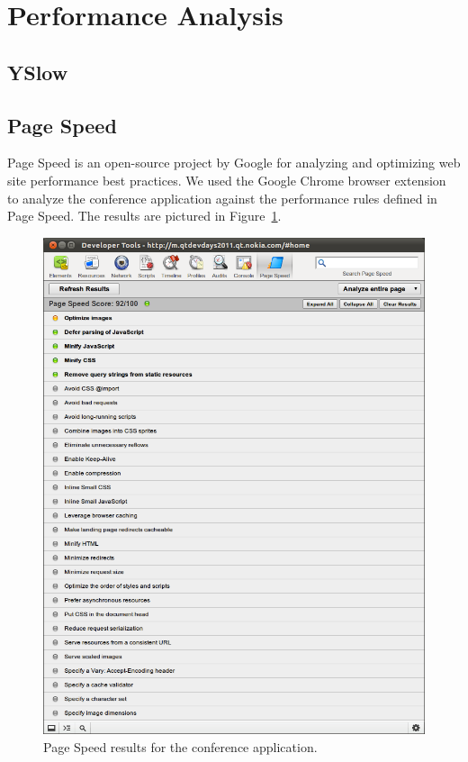 \section{Performance Analysis}
\label{section:performance-analysis}

\subsection{YSlow}
\subsection{Page Speed}

Page Speed \citationneeded is an open-source project by Google for
analyzing and optimizing web site performance best practices. We used
the Google Chrome browser extension to analyze the conference
application against the performance rules defined in Page Speed. The
results are pictured in Figure~\ref{figure:devdays-pagespeed.png}.

\begin{figure}[ht]
  \begin{center}
    \includegraphics[width=\textwidth]{images/devdays-pagespeed.png}
    \caption{Page Speed results for the conference application.}
    \label{figure:devdays-pagespeed.png}
  \end{center}
\end{figure}

